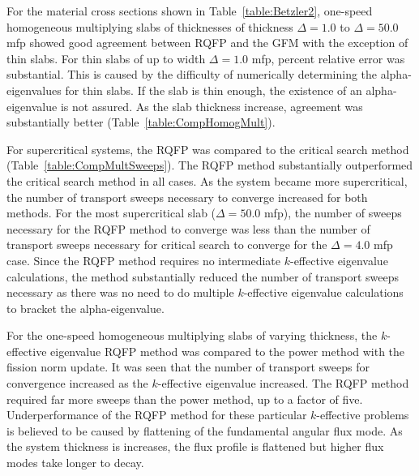 For the material cross sections shown in Table~\ref{table:Betzler2}, one-speed homogeneous multiplying slabs of thicknesses of thickness $\Delta = 1.0$ to $\Delta = 50.0$ mfp showed good agreement between RQFP and the GFM with the exception of thin slabs. For thin slabs of up to width $\Delta = 1.0$ mfp, percent relative error was substantial. This is caused by the difficulty of numerically determining the alpha-eigenvalues for thin slabs. If the slab is thin enough, the existence of an alpha-eigenvalue is not assured. As the slab thickness increase, agreement was substantially better (Table~\ref{table:CompHomogMult}). 

For supercritical systems, the RQFP was compared to the critical search method (Table~\ref{table:CompMultSweeps}). The RQFP method substantially outperformed the critical search method in all cases. As the system became more supercritical, the number of transport sweeps necessary to converge increased for both methods. For the most supercritical slab ($\Delta = 50.0$ mfp), the number of sweeps necessary for the RQFP method to converge was less than the number of transport sweeps necessary for critical search to converge for the $\Delta = 4.0$ mfp case. Since the RQFP method requires no intermediate $k$-effective eigenvalue calculations, the method substantially reduced the number of transport sweeps necessary as there was no need to do multiple $k$-effective eigenvalue calculations to bracket the alpha-eigenvalue.

For the one-speed homogeneous multiplying slabs of varying thickness, the $k$-effective eigenvalue RQFP method was compared to the power method with the fission norm update. It was seen that the number of transport sweeps for convergence increased as the $k$-effective eigenvalue increased. The RQFP method required far more sweeps than the power method, up to a factor of five. Underperformance of the RQFP method for these particular $k$-effective problems is believed to be caused by flattening of the fundamental angular flux mode. As the system thickness is increases, the flux profile is flattened but higher flux modes take longer to decay.

